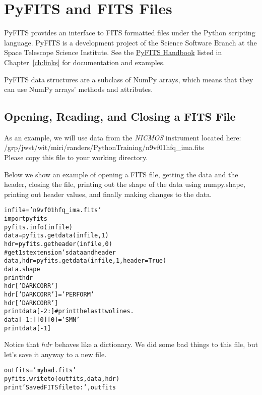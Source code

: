 \chapter{PyFITS and FITS Files}
\label{ch:pyfits}
PyFITS provides an interface to FITS formatted files under the Python
scripting language.  PyFITS is a development project of the Science
Software Branch at the Space Telescope Science Institute.  See the 
\href{http://stsdas.stsci.edu/download/wikidocs/The_PyFITS_Handbook.pdf}{PyFITS Handbook}
listed in Chapter~\ref{ch:links} for documentation and
examples.

PyFITS data structures are a subclass of NumPy arrays, which means
that they can use NumPy arrays' methods and attributes.
 
\section{Opening, Reading, and Closing a FITS File }
As an example, we will use data from the \emph{NICMOS} instrument located here:  \\
/grp/jwst/wit/miri/randers/PythonTraining/n9vf01hfq\_ima.fits \\ 
Please copy this file to your working directory. 

Below we show an example of opening a FITS file, getting
the data and the header, closing the file, printing out the shape of
the data using {\sf \small numpy.shape}, printing out header values,
and finally making changes to the data.

\begin{alltt}
\pytab infile = 'n9vf01hfq_ima.fits'
\pytab import pyfits 
\pytab pyfits.info(infile)
\pytab data = pyfits.getdata(infile, 1) 
\pytab hdr = pyfits.getheader(infile, 0) 
# get 1st extension's data and header 
\pytab data, hdr = pyfits.getdata(infile, 1, header=True)
\pytab data.shape
\pytab print hdr 
\pytab hdr['DARKCORR'] 
\pytab hdr['DARKCORR'] = 'PERFORM'
\pytab hdr['DARKCORR']
\pytab print data[-2:]  #print the last two lines.
\pytab data[-1:][0][0] = 'SMN'
\pytab print data[-1]
\end{alltt}

Notice that $hdr$ behaves like a dictionary.  We did some
bad things to this file, but let's save it anyway to a new file.

\begin{alltt}
\pytab outfits = 'mybad.fits'
\pytab pyfits.writeto(outfits, data, hdr)
\pytab print 'Saved FITS file to: ',outfits
\end{alltt}

